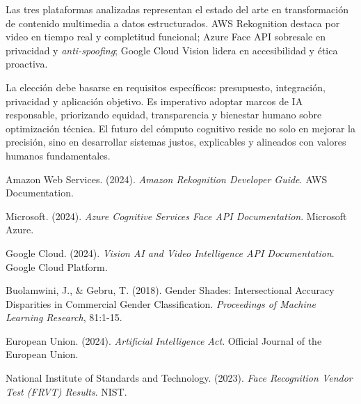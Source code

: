 \documentclass[12pt,a4paper]{article}
\begin{document}
Las tres plataformas analizadas representan el estado del arte en transformación de contenido multimedia a datos estructurados. AWS Rekognition destaca por video en tiempo real y completitud funcional; Azure Face API sobresale en privacidad y \textit{anti-spoofing}; Google Cloud Vision lidera en accesibilidad y ética proactiva.

La elección debe basarse en requisitos específicos: presupuesto, integración, privacidad y aplicación objetivo. Es imperativo adoptar marcos de IA responsable, priorizando equidad, transparencia y bienestar humano sobre optimización técnica. El futuro del cómputo cognitivo reside no solo en mejorar la precisión, sino en desarrollar sistemas justos, explicables y alineados con valores humanos fundamentales.

\begin{thebibliography}{9}
Amazon Web Services. (2024). \textit{Amazon Rekognition Developer Guide}. AWS Documentation.

Microsoft. (2024). \textit{Azure Cognitive Services Face API Documentation}. Microsoft Azure.

Google Cloud. (2024). \textit{Vision AI and Video Intelligence API Documentation}. Google Cloud Platform.

Buolamwini, J., \& Gebru, T. (2018). Gender Shades: Intersectional Accuracy Disparities in Commercial Gender Classification. \textit{Proceedings of Machine Learning Research}, 81:1-15.

European Union. (2024). \textit{Artificial Intelligence Act}. Official Journal of the European Union.

National Institute of Standards and Technology. (2023). \textit{Face Recognition Vendor Test (FRVT) Results}. NIST.
\end{thebibliography}
\end{document}
